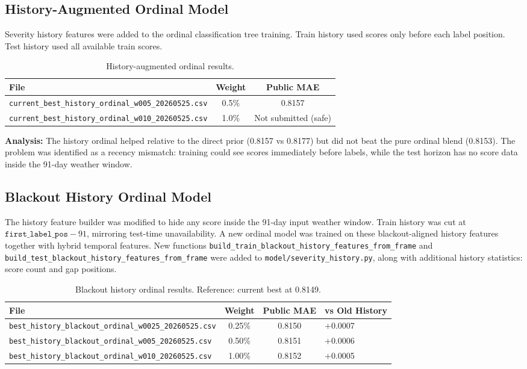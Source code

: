 \documentclass[12pt, a4paper]{article}
\begin{document}
\subsection{History-Augmented Ordinal Model}
Severity history features were added to the ordinal classification tree training. Train history used scores only before each label position. Test history used all available train scores.

\begin{table}[H]
\centering
\caption{History-augmented ordinal results.}
\label{tab:hist1}
\begin{tabular}{@{}lcc@{}}
\toprule
\textbf{File} & \textbf{Weight} & \textbf{Public MAE} \\
\midrule
\texttt{current\_best\_history\_ordinal\_w005\_20260525.csv}  & 0.5\% & 0.8157 \\
\texttt{current\_best\_history\_ordinal\_w010\_20260525.csv}  & 1.0\% & Not submitted (safe) \\
\bottomrule
\end{tabular}
\end{table}

\textbf{Analysis:} The history ordinal helped relative to the direct prior (0.8157 vs 0.8177) but did not beat the pure ordinal blend (0.8153). The problem was identified as a recency mismatch: training could see scores immediately before labels, while the test horizon has no score data inside the 91-day weather window.

\subsection{Blackout History Ordinal Model}
The history feature builder was modified to hide any score inside the 91-day input weather window. Train history was cut at $\texttt{first\_label\_pos} - 91$, mirroring test-time unavailability. A new ordinal model was trained on these blackout-aligned history features together with hybrid temporal features. New functions \texttt{build\_train\_blackout\_history\_features\_from\_frame} and \texttt{build\_test\_blackout\_history\_features\_from\_frame} were added to \texttt{model/severity\_history.py}, along with additional history statistics: score count and gap positions.

\begin{table}[H]
\centering
\caption{Blackout history ordinal results. Reference: current best at 0.8149.}
\label{tab:hist2}
\begin{tabular}{@{}lccl@{}}
\toprule
\textbf{File} & \textbf{Weight} & \textbf{Public MAE} & \textbf{vs Old History} \\
\midrule
\texttt{best\_history\_blackout\_ordinal\_w0025\_20260525.csv} & 0.25\% & 0.8150 & $+$0.0007 \\
\texttt{best\_history\_blackout\_ordinal\_w005\_20260525.csv}  & 0.50\% & 0.8151 & $+$0.0006 \\
\texttt{best\_history\_blackout\_ordinal\_w010\_20260525.csv}  & 1.00\% & 0.8152 & $+$0.0005 \\
\bottomrule
\end{tabular}
\end{table}
\end{document}
